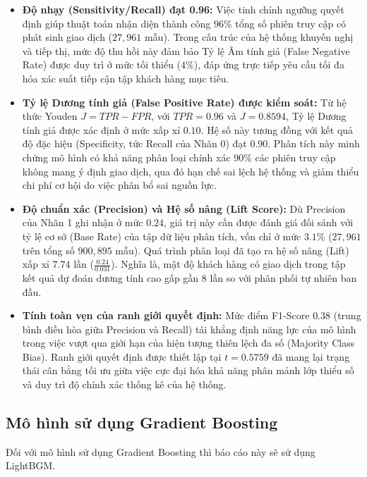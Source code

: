 \documentclass[a4paper,11pt]{article}
\begin{document}
 \begin{itemize}
    \item \textbf{Độ nhạy (Sensitivity/Recall) đạt 0.96:} Việc tinh chỉnh ngưỡng quyết định giúp thuật toán nhận diện thành công $96\%$ tổng số phiên truy cập có phát sinh giao dịch ($27,961$ mẫu). Trong cấu trúc của hệ thống khuyến nghị và tiếp thị, mức độ thu hồi này đảm bảo Tỷ lệ Âm tính giả (False Negative Rate) được duy trì ở mức tối thiểu ($4\%$), đáp ứng trực tiếp yêu cầu tối đa hóa xác suất tiếp cận tập khách hàng mục tiêu.
    
    \item \textbf{Tỷ lệ Dương tính giả (False Positive Rate) được kiểm soát:} Từ hệ thức Youden $J = TPR - FPR$, với $TPR = 0.96$ và $J = 0.8594$, Tỷ lệ Dương tính giả được xác định ở mức xấp xỉ $0.10$. Hệ số này tương đồng với kết quả độ đặc hiệu (Specificity, tức Recall của Nhãn 0) đạt $0.90$. Phân tích này minh chứng mô hình có khả năng phân loại chính xác $90\%$ các phiên truy cập không mang ý định giao dịch, qua đó hạn chế sai lệch hệ thống và giảm thiểu chi phí cơ hội do việc phân bổ sai nguồn lực.
    
    \item \textbf{Độ chuẩn xác (Precision) và Hệ số nâng (Lift Score):} Dù Precision của Nhãn 1 ghi nhận ở mức $0.24$, giá trị này cần được đánh giá đối sánh với tỷ lệ cơ sở (Base Rate) của tập dữ liệu phân tích, vốn chỉ ở mức $3.1\%$ ($27,961$ trên tổng số $900,895$ mẫu). Quá trình phân loại đã tạo ra hệ số nâng (Lift) xấp xỉ $7.74$ lần ($\frac{0.24}{0.031}$). Nghĩa là, mật độ khách hàng có giao dịch trong tập kết quả dự đoán dương tính cao gấp gần 8 lần so với phân phối tự nhiên ban đầu.
    
    \item \textbf{Tính toàn vẹn của ranh giới quyết định:} Mức điểm F1-Score $0.38$ (trung bình điều hòa giữa Precision và Recall) tái khẳng định năng lực của mô hình trong việc vượt qua giới hạn của hiện tượng thiên lệch đa số (Majority Class Bias). Ranh giới quyết định được thiết lập tại $t = 0.5759$ đã mang lại trạng thái cân bằng tối ưu giữa việc cực đại hóa khả năng phân mảnh lớp thiểu số và duy trì độ chính xác thống kê của hệ thống.
\end{itemize}
\subsection{Mô hình sử dụng Gradient Boosting}
Đối với mô hình sử dụng Gradient Boosting thì báo cáo này sẽ sử dụng LightBGM.
\end{document}
